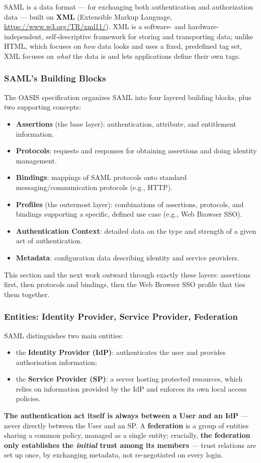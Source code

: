 \documentclass[12pt, a4paper]{article}
\begin{document}
SAML is a data format --- for exchanging both authentication and authorization data --- built on \textbf{XML} (Extensible Markup Language, \url{https://www.w3.org/TR/xml11/}). XML is a software- and hardware-independent, self-descriptive framework for storing and transporting data; unlike HTML, which focuses on \emph{how} data looks and uses a fixed, predefined tag set, XML focuses on \emph{what} the data is and lets applications define their own tags.

\subsubsection{SAML's Building Blocks}
The OASIS specification organizes SAML into four layered building blocks, plus two supporting concepts:
\begin{itemize}
    \item \textbf{Assertions} (the base layer): authentication, attribute, and entitlement information.
    \item \textbf{Protocols}: requests and responses for obtaining assertions and doing identity management.
    \item \textbf{Bindings}: mappings of SAML protocols onto standard messaging/communication protocols (e.g., HTTP).
    \item \textbf{Profiles} (the outermost layer): combinations of assertions, protocols, and bindings supporting a specific, defined use case (e.g., Web Browser SSO).
    \item \textbf{Authentication Context}: detailed data on the type and strength of a given act of authentication.
    \item \textbf{Metadata}: configuration data describing identity and service providers.
\end{itemize}
This section and the next work outward through exactly these layers: assertions first, then protocols and bindings, then the Web Browser SSO profile that ties them together.

\subsubsection{Entities: Identity Provider, Service Provider, Federation}
SAML distinguishes two main entities:
\begin{itemize}
    \item the \textbf{Identity Provider (IdP)}: authenticates the user and provides authorisation information;
    \item the \textbf{Service Provider (SP)}: a server hosting protected resources, which relies on information provided by the IdP and enforces its own local access policies.
\end{itemize}
\textcolor{red!70!black}{\textbf{The authentication act itself is always between a User and an IdP}} --- never directly between the User and an SP. A \textbf{federation} is a group of entities sharing a common policy, managed as a single entity; crucially, \textcolor{blue!50!black}{\textbf{the federation only establishes the \emph{initial} trust among its members}} --- trust relations are set up once, by exchanging metadata, not re-negotiated on every login.
\end{document}

